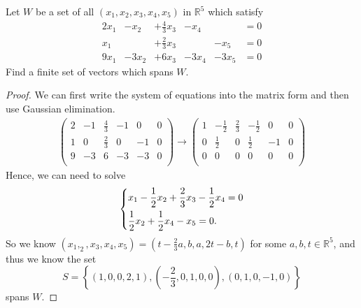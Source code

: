 \begin{problem}
    Let \(W\) be a set of all \((x_1, x_2, x_3, x_4, x_5)\) in \(\mathbb{R} ^5\) which satisfy 
    \[
        \begin{aligned}
        2x_1 &- x_2 &+ \tfrac{4}{3}x_3 &- x_4 & &= 0\\
        x_1  &      &+ \tfrac{2}{3}x_3 & &- x_5 &= 0\\
        9x_1 &- 3x_2 &+ 6x_3           &- 3x_4 &- 3x_5& = 0
        \end{aligned}
    \]
Find a finite set of vectors which spans \(W\). 
\end{problem}
\begin{proof}
    We can first write the system of equations into the matrix form and then use Gaussian elimination.
\begin{align*}
    \begin{pmatrix}
        2 & -1 & \frac{4}{3} & -1 & 0& 0  \\
        1 &  0&  \frac{2}{3}&  0& -1& 0  \\
        9 & -3 & 6 & -3 & -3 &0  \\
    \end{pmatrix} \to \begin{pmatrix}
        1 &  -\frac{1}{2}& \frac{2}{3} & -\frac{1}{2} &  0& 0  \\
        0 &  \frac{1}{2}&  0&  \frac{1}{2}&  -1& 0  \\
        0 &  0&  0&  0&  0&  0 \\
    \end{pmatrix}
\end{align*}
Hence, we can need to solve
\[
    \begin{dcases}
        x_1 - \frac{1}{2}x_2 + \frac{2}{3}x_3 - \frac{1}{2}x_4 = 0 \\
        \frac{1}{2}x_2 + \frac{1}{2} x_4 - x_5 = 0.
    \end{dcases}
\]
So we know \((x_1, _2, x_3, x_4, x_5) = \left( t - \frac{2}{3}a, b, a, 2t - b, t \right) \) for some \(a,b,t \in \mathbb{R} ^5\), and thus we know the set 
\[
    S = \left\{ \left( 1,0,0,2,1 \right), \left( -\frac{2}{3}, 0, 1, 0, 0 \right), \left( 0, 1, 0, -1, 0 \right)   \right\} 
\]  spans \(W\). 
\end{proof}

